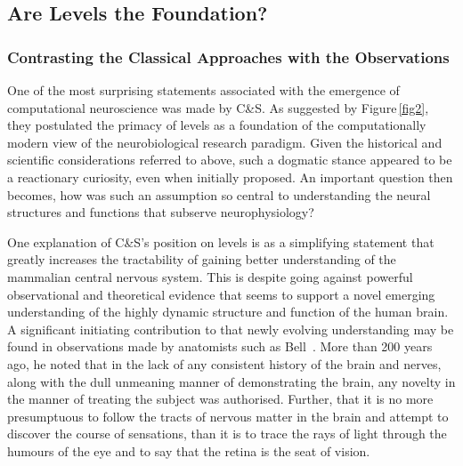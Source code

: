 \documentclass[10pt,letterpaper]{article}
\begin{document}
\subsection*{Are Levels the Foundation?}

\subsubsection*{Contrasting the Classical Approaches with the Observations}

One of the most surprising statements associated with the emergence of computational neuroscience was made by C\&S. As suggested by Figure\,\ref{fig2}, they postulated the primacy of levels as a foundation of the computationally modern view of the neurobiological research paradigm. Given the historical and scientific considerations referred to above, such a dogmatic stance appeared to be a reactionary curiosity, even when initially proposed. An important question then becomes, how was such an assumption so central to understanding the neural structures and functions that subserve neurophysiology?

One explanation of C\&S's position on levels is as a simplifying statement that greatly increases the tractability of gaining better understanding of the mammalian central nervous system. This is despite going against powerful observational and theoretical evidence that seems to support a novel emerging understanding of the highly dynamic structure and function of the human brain. A significant initiating contribution to that newly evolving understanding may be found in observations made by anatomists such as Bell~\cite{bell11}.  More than 200 years ago, he noted that in the lack of any consistent history of the brain and nerves, along with the dull unmeaning manner of demonstrating the brain, any novelty in the manner of treating the subject was authorised. Further, that it is no more presumptuous to follow the tracts of nervous matter in the brain and attempt to discover the course of sensations, than it is to trace the rays of light through the humours of the eye and to say that the retina is the seat of vision.
\end{document}
